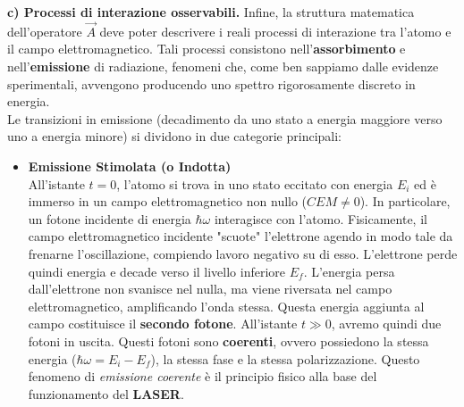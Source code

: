 \textbf{c) Processi di interazione osservabili.} Infine, la struttura matematica dell'operatore \( \vec{A} \) deve poter descrivere i reali processi di interazione tra l'atomo e il campo elettromagnetico. 
Tali processi consistono nell'\textbf{assorbimento} e nell'\textbf{emissione} di radiazione, fenomeni che, come ben sappiamo dalle evidenze sperimentali, avvengono producendo uno spettro rigorosamente discreto in energia.\\
Le transizioni in emissione (decadimento da uno stato a energia maggiore verso uno a energia minore) si dividono in due categorie principali:
\begin{itemize}
    \item \textbf{Emissione Stimolata (o Indotta)}\\
All'istante \(t=0\), l'atomo si trova in uno stato eccitato con energia \(E_i\) ed è immerso in un campo elettromagnetico non nullo (\(CEM \neq 0\)). In particolare, un fotone incidente di energia \(\hbar\omega\) interagisce con l'atomo. 
Fisicamente, il campo elettromagnetico incidente "scuote" l'elettrone agendo in modo tale da frenarne l'oscillazione, compiendo lavoro negativo su di esso. L'elettrone perde quindi energia e decade verso il livello inferiore \(E_f\). L'energia persa dall'elettrone non svanisce nel nulla, ma viene riversata nel campo elettromagnetico, amplificando l'onda stessa. Questa energia aggiunta al campo costituisce il \textbf{secondo fotone}.
All'istante \(t \gg 0\), avremo quindi due fotoni in uscita. Questi fotoni sono \textbf{coerenti}, ovvero possiedono la stessa energia (\(\hbar\omega = E_i - E_f\)), la stessa fase e la stessa polarizzazione. Questo fenomeno di \textit{emissione coerente} è il principio fisico alla base del funzionamento del \textbf{LASER}.
    \begin{figure}[htbp]
    \centering
\end{figure}
\end{itemize}
